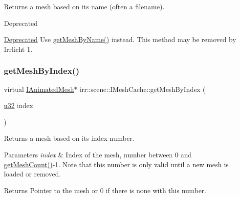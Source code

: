Returns a mesh based on its name (often a filename). 

\begin{DoxyRefDesc}{Deprecated}
\item[\hyperlink{deprecated__deprecated000035}{Deprecated}]Use \hyperlink{classirr_1_1scene_1_1IMeshCache_a4c93e736bdca8c84d478afc82540d6bb}{get\+Mesh\+By\+Name()} instead. This method may be removed by Irrlicht 1. \end{DoxyRefDesc}
\mbox{\label{classirr_1_1scene_1_1IMeshCache_a06e7755013445f9bc3d7339fbd009e31}} 
\subsubsection{\texorpdfstring{get\+Mesh\+By\+Index()}{getMeshByIndex()}\hspace{0.1cm}{\footnotesize\ttfamily [1/2]}}
{\footnotesize\ttfamily virtual \hyperlink{classirr_1_1scene_1_1IAnimatedMesh}{I\+Animated\+Mesh}$\ast$ irr\+::scene\+::\+I\+Mesh\+Cache\+::get\+Mesh\+By\+Index (\begin{DoxyParamCaption}\item[{\hyperlink{namespaceirr_a0416a53257075833e7002efd0a18e804}{u32}}]{index }\end{DoxyParamCaption})\hspace{0.3cm}{\ttfamily [pure virtual]}}



Returns a mesh based on its index number. 


\begin{DoxyParams}{Parameters}
{\em index} & Index of the mesh, number between 0 and \hyperlink{classirr_1_1scene_1_1IMeshCache_a9dc99e46309a6ef494ef7672c9b49853}{get\+Mesh\+Count()}-\/1. Note that this number is only valid until a new mesh is loaded or removed. \\
\hline
\end{DoxyParams}
\begin{DoxyReturn}{Returns}
Pointer to the mesh or 0 if there is none with this number. 
\end{DoxyReturn}
\mbox{\label{classirr_1_1scene_1_1IMeshCache_a06e7755013445f9bc3d7339fbd009e31}} 
